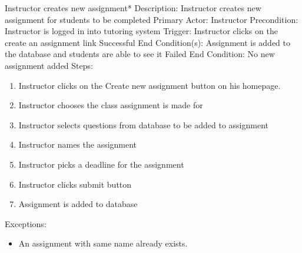     \begin{section}{Instructor creates new assignment*}
		Description: Instructor creates new assignment for students to be completed \newline
		Primary Actor: Instructor \newline
		Precondition: Instructor is logged in into tutoring system \newline
		Trigger: Instructor clicks on the create an assignment link \newline
		Successful End Condition(s): Assignment is added to the database and students are able to see it \newline
		Failed End Condition: No new assignment added \newline
        \newline
        Steps:
        \begin{enumerate}
            \item{Instructor clicks on the Create new assignment button on his homepage.}
            \item{Instructor chooses the class assignment is made for}
            \item{Instructor selects questions from database to be added to assignment}
            \item{Instructor names the assignment}
            \item{Instructor picks a deadline for the assignment}
            \item{Instructor clicks submit button}
            \item{Assignment is added to database}
        \end{enumerate}
        Exceptions:
        \begin{itemize}
            \item{An assignment with same name already exists.}
        \end{itemize}
    \end{section}


